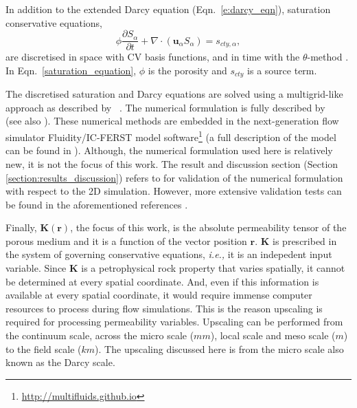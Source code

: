 \documentclass[preprint,12pt]{elsarticle}
\newcommand{\ie}{{\it i.e., }}
\begin{document}
In addition to the extended Darcy equation (Eqn.~\ref{e:darcy_eqn}), saturation conservative equations,
\begin{equation}
  \phi\displaystyle\frac{\partial S_{\alpha} }{\partial t} + \nabla
  \cdot \left( {\mathbf u}_{\alpha} S_{\alpha}\right) =
  s_{cty,\alpha},
  \label{saturation_equation}
\end{equation}
are discretised in space with CV basis functions, and in time with the $\theta$-method \cite{pavlidis_2013b}. In Eqn.~\ref{saturation_equation}, $\phi$ is the porosity and $s_{cty}$ is a source term.

\medskip
The discretised saturation and Darcy equations are solved using a multigrid-like approach as described by \citeauthor{pavlidis2016}~\cite{pavlidis2016}. The numerical formulation is fully described by \citeauthor{Gomes_2017}~\cite{Gomes_2017} (see also \cite{salinas2015,adam_2016}). These numerical methods are embedded in the next-generation flow simulator Fluidity/IC-FERST model software\footnote{\href{http://multifluids.github.io}{http://multifluids.github.io}} (a full description of the model can be found in \cite{jackson_2013,Gomes_2017}). Although, the numerical formulation used here is relatively new, it is not the focus of this work. The result and discussion section (Section \ref{section:results_discussion}) refers to \citet{dawe_2008} for validation of the numerical formulation with respect to the 2D simulation. However, more extensive validation tests can be found in the aforementioned references \cite{adam_2016, Gomes_2017,jackson_2013, pavlidis2016, salinas2015}.


\medskip
Finally, $\mathbf{K}\left(\mathbf{r}\right)$, the focus of this work, is the absolute permeability tensor of the porous medium and it is a function of the vector position $\mathbf{r}$. $\mathbf{K}$ is prescribed in the system of governing conservative equations, \ie it is an indepedent input variable. Since $\mathbf{K}$ is a petrophysical rock property that varies spatially, it cannot be determined at every spatial coordinate. And, even if this information is available at every spatial coordinate, it would require immense computer resources to process during flow simulations. This is the reason upscaling is required for processing permeability variables. Upscaling can be performed from the continuum scale, across the micro scale ($mm$), local scale and meso scale ($m$) to the field scale ($km$)\cite{ECMI_2004}. The upscaling discussed here is from the micro scale also known as the Darcy scale.
\end{document}
